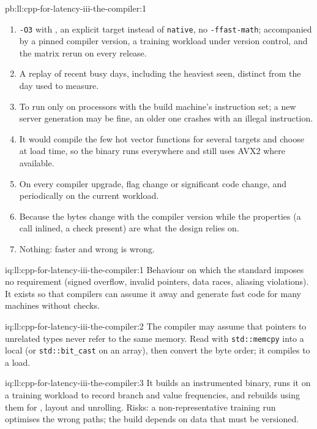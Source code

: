 \begin{solution}{pb:ll:cpp-for-latency-iii-the-compiler:1}
\begin{enumerate}
faster and changed its value.
\item \texttt{-O3} with , an explicit target instead of \texttt{native}, no
\texttt{-ffast-math}; accompanied by a pinned compiler version, a training workload under version control, and the matrix
rerun on every release.
\item A replay of recent busy days, including the heaviest seen, distinct from the day used to measure.
\item To run only on processors with the build machine's instruction set; a new server generation may be fine, an older
one crashes with an illegal instruction.
\item It would compile the few hot vector functions for several targets and choose at load time, so the binary runs
everywhere and still uses AVX2 where available.
\item On every compiler upgrade, flag change or significant code change, and periodically on the current workload.
\item Because the bytes change with the compiler version while the properties (a call inlined, a check present) are what
the design relies on.
\item Nothing: faster and wrong is wrong.
\end{enumerate}
\end{solution}

\begin{solution}{iq:ll:cpp-for-latency-iii-the-compiler:1}
Behaviour on which the standard imposes no requirement (signed overflow, invalid pointers, data races, aliasing
violations). It exists so that compilers can assume it away and generate fast code for many machines without checks.
\end{solution}

\begin{solution}{iq:ll:cpp-for-latency-iii-the-compiler:2}
The compiler may assume that pointers to unrelated types never refer to the same memory. Read with \texttt{std::memcpy}
into a local (or \texttt{std::bit\_cast} on an array), then convert the byte order; it compiles to a load.
\end{solution}

\begin{solution}{iq:ll:cpp-for-latency-iii-the-compiler:3}
It builds an instrumented binary, runs it on a training workload to record branch and value frequencies, and rebuilds
using them for , layout and unrolling. Risks: a non-representative training run optimises the wrong paths; the
build depends on data that must be versioned.
\end{solution}

